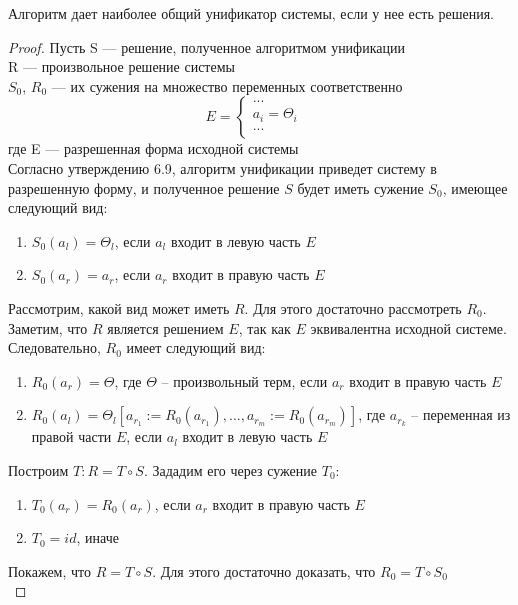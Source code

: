 	\begin{statement} Алгоритм дает наиболее общий унификатор системы, если у нее есть решения. \end{statement}
	\begin{proof}
		Пусть S — решение, полученное алгоритмом унификации \\
			  R — произвольное решение системы \\
			  $S_0$, $R_0$ — их сужения на множество переменных соответственно \\
			  \[E=\begin{cases}
			  ...&\\
			  a_i=\Theta_i&\\
			  ...\\
			  \end{cases}\]
			  где E — разрешенная форма исходной системы \\
		Согласно утверждению 6.9, алгоритм унификации приведет систему в разрешенную форму, и полученное решение $S$ будет иметь сужение $S_0$, имеющее следующий вид:
		\begin{enumerate}
			\item $S_0(a_l) = \Theta_l$, если $a_l$ входит в левую часть $E$
			\item $S_0(a_r) = a_r$, если $a_r$ входит в правую часть $E$
		\end{enumerate}
		Рассмотрим, какой вид может иметь $R$. Для этого достаточно рассмотреть $R_0$. \\
		Заметим, что $R$ является решением $E$, так как $E$ эквивалентна исходной системе. \\
		Следовательно, $R_0$ имеет следующий вид:
		\begin{enumerate}
			\item $R_0(a_r) = \Theta$, где $\Theta$ -- произвольный терм, если $a_r$ входит в правую часть $E$
			\item $R_0(a_l) = \Theta_l[a_{r_1}:=R_0(a_{r_1}),...,a_{r_m}:=R_0(a_{r_m})]$, где $a_{r_k}$ -- переменная из правой части $E$, если $a_l$ входит в левую часть $E$
		\end{enumerate}
		Построим $T:R=T\circ S$. Зададим его через сужение $T_0$:
		\begin{enumerate}
			\item $T_0(a_r) = R_0(a_r)$, если $a_r$ входит в правую часть $E$
			\item $T_0 = id$, иначе
		\end{enumerate}
		Покажем, что $R=T\circ S$.
		Для этого достаточно доказать, что $R_0 = T \circ S_0$ \\

\end{proof}
